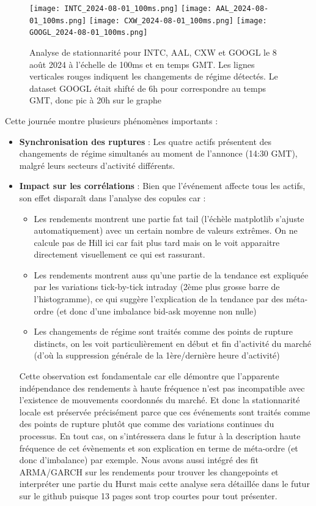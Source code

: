 \documentclass[10pt,a4paper]{article}
\theoremstyle{definition}
\theoremstyle{remark}
\begin{document}
\begin{figure}[h!]
\centering
        \texttt{[image: INTC\_2024-08-01\_100ms.png]}
        \texttt{[image: AAL\_2024-08-01\_100ms.png]}
        \texttt{[image: CXW\_2024-08-01\_100ms.png]}
        \texttt{[image: GOOGL\_2024-08-01\_100ms.png]}
    \caption{Analyse de stationnarité pour INTC, AAL, CXW et GOOGL le 8 août 2024 à l'échelle de 100ms et en temps GMT. Les lignes verticales rouges indiquent les changements de régime détectés.
    Le dataset GOOGL était shifté de 6h pour correspondre au temps GMT, donc pic à 20h sur le graphe}
    \label{fig:stationarity_unemployment}
\end{figure}

Cette journée montre plusieurs phénomènes importants :

\begin{itemize}
    \item \textbf{Synchronisation des ruptures} : Les quatre actifs présentent des changements de régime simultanés au moment de l'annonce (14:30 GMT), malgré leurs secteurs d'activité différents.

    \item \textbf{Impact sur les corrélations} : Bien que l'événement affecte tous les actifs, son effet disparaît dans l'analyse des copules car :
\begin{itemize}
        \item Les rendements montrent une partie fat tail (l'échèle matplotlib s'ajuste automatiquement) avec un certain nombre de valeurs extrêmes. On ne calcule pas de Hill ici car fait plus tard mais on le voit apparaitre directement visuellement ce qui est rassurant.
        \item Les rendements montrent auss qu'une partie de la tendance est expliquée par les variations tick-by-tick intraday (2ème plus grosse barre de l'histogramme), ce qui suggère l'explication de la tendance par des méta-ordre (et donc d'une imbalance bid-ask moyenne non nulle)
        \item Les changements de régime sont traités comme des points de rupture distincts, on les voit particulièrement en début et fin d'activité  du marché (d'où la suppression générale de la 1ère/dernière heure d'activité)
\end{itemize}


Cette observation est fondamentale car elle démontre que l'apparente indépendance des rendements à haute fréquence n'est pas incompatible avec l'existence de mouvements coordonnés du marché. 
Et donc la stationnarité locale est préservée précisément parce que ces événements sont traités comme des points de rupture plutôt que comme des variations continues du processus.
En tout cas, on s'intéressera dans le futur à la description haute fréquence de cet évènements et son explication en terme de méta-ordre (et donc d'imbalance) par exemple. 
Nous avons aussi intégré des fit ARMA/GARCH sur les rendements pour trouver les changepoints et interpréter une partie du Hurst mais cette analyse sera détaillée dans le futur sur le github puisque 13 pages sont trop courtes pour tout présenter.


\end{itemize}
\end{document}
